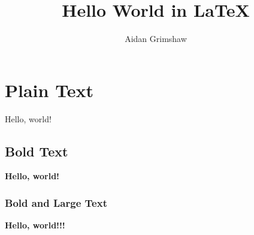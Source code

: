 \documentclass[12pt]{article}
\title{Hello World in LaTeX}
\author{Aidan Grimshaw}
\begin{document}
\maketitle
\tableofcontents


\section{Plain Text}
Hello, world!
\subsection{Bold Text}
{\bf Hello, world!}
\subsubsection{Bold and Large Text}
{\Large \bf Hello, world!!!}




\end{document}
